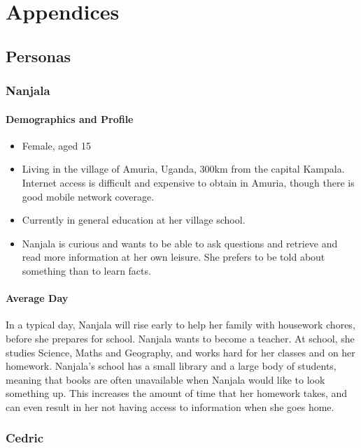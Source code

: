 \documentclass[authoryearcitations]{UoYCSproject}
\begin{document}
\newpage




\appendix
\part{Appendices}

\newpage
\chapter{Personas}
\label{sec:appendixPersonas}
\section{Nanjala}
\subsection{Demographics and Profile}
\begin{itemize}
  \item Female, aged 15
  \item Living in the village of Amuria, Uganda, 300km from the capital Kampala.  Internet access is difficult and expensive to obtain in Amuria, though there is good mobile network coverage.
  \item Currently in general education at her village school.
  \item Nanjala is curious and wants to be able to ask questions and retrieve and read more information at her own leisure.  She prefers to be told about something than to learn facts.
\end{itemize}
\subsection{Average Day}
In a typical day, Nanjala will rise early to help her family with housework chores, before she prepares for school.  Nanjala wants to become a teacher.  At school, she studies Science, Maths and Geography, and works hard for her classes and on her homework.  Nanjala's school has a small library and a large body of students, meaning that books are often unavailable when Nanjala would like to look something up.  This increases the amount of time that her homework takes, and can even result in her not having access to information when she goes home.

\newpage
\section{Cedric}
\end{document}
